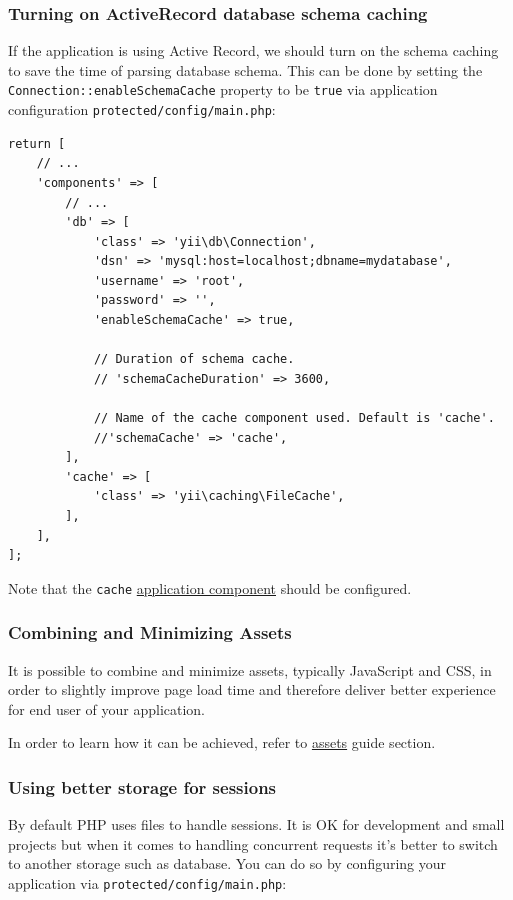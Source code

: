 \subsubsection{Turning on ActiveRecord database schema caching}
If the application is using Active Record, we should turn on the schema caching
to save the time of parsing database schema. This can be done by setting the
\lstinline|Connection::enableSchemaCache| property to be \lstinline|true| via application configuration
\lstinline|protected/config/main.php|:

\lstset{language=php}\begin{lstlisting}
return [
    // ...
    'components' => [
        // ...
        'db' => [
            'class' => 'yii\db\Connection',
            'dsn' => 'mysql:host=localhost;dbname=mydatabase',
            'username' => 'root',
            'password' => '',
            'enableSchemaCache' => true,

            // Duration of schema cache.
            // 'schemaCacheDuration' => 3600,

            // Name of the cache component used. Default is 'cache'.
            //'schemaCache' => 'cache',
        ],
        'cache' => [
            'class' => 'yii\caching\FileCache',
        ],
    ],
];
\end{lstlisting}
Note that the \lstinline|cache| \hyperref[structure-application-components.md]{application component} should be configured.

\subsubsection{Combining and Minimizing Assets}
It is possible to combine and minimize assets, typically JavaScript and CSS, in order to slightly improve page load
time and therefore deliver better experience for end user of your application.

In order to learn how it can be achieved, refer to \hyperref[structure-assets.md]{assets} guide section.

\subsubsection{Using better storage for sessions}
By default PHP uses files to handle sessions. It is OK for development and
small projects but when it comes to handling concurrent requests it's better to
switch to another storage such as database. You can do so by configuring your
application via \lstinline|protected/config/main.php|:

